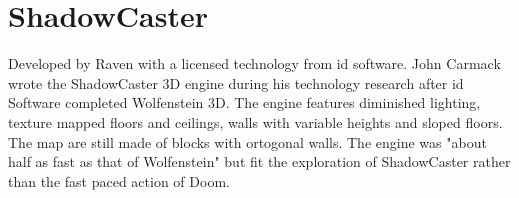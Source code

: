 \section{ShadowCaster}
\label{label_shadowcaster}
Developed by Raven with a licensed technology from id software. John Carmack wrote the ShadowCaster 3D engine during his technology research after id Software completed Wolfenstein 3D. The engine features diminished lighting, texture mapped floors and ceilings, walls with variable heights and sloped floors. The map are still made of blocks with ortogonal walls. The engine was "about half as fast as that of Wolfenstein" but fit the exploration of ShadowCaster rather than the fast paced action of Doom.

\begin{figure}[H]
\centering
 \end{figure}
 \par
\begin{figure}[H]
\centering
 \end{figure}
 \par
